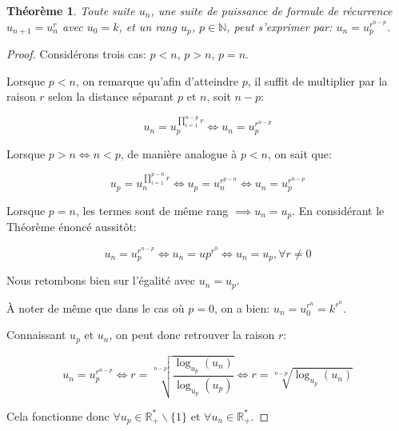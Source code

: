 \documentclass{amsart}
\newtheorem{theorem}{Théorème}[section]
\theoremstyle{definition}
\theoremstyle{remark}
\numberwithin{equation}{section}
\begin{document}
\begin{theorem}
    Toute suite $u_n$, une suite de puissance de formule de récurrence $u_{n+1}=u_n^r$ avec $u_0=k$, et un rang $u_p$, $p \in \mathbb{N}$, peut s'exprimer par: $u_n = u_p^{r^{n-p}}$.
\end{theorem}

\begin{proof}
    Considérons trois cas: $p<n$, $p>n$, $p=n$.

    Lorsque $p<n$, on remarque qu'afin d'atteindre $p$, il suffit de multiplier par la raison $r$ selon la distance séparant $p$ et $n$, soit $n-p$:
    
    \[u_n = u_p^{\prod_{i=1}^{n-p}r} \iff u_n = u_p^{r^{n-p}}\]
    
    Lorsque $p>n \iff n<p$, de manière analogue à $p<n$, on sait que:

    \[u_p = u_n^{\prod_{i=1}^{p-n}r} \iff u_p = u_n^{r^{p-n}} \iff u_n = u_p^{r^{n-p}}\]


    Lorsque $p=n$, les termes sont de même rang $\implies u_n=u_p$. En considérant le Théorème énoncé aussitôt:

    \[u_n = u_p^{r^{n-p}} \iff u_n=up^{r^0} \iff u_n=u_p, \forall r \ne 0\]

    Nous retombons bien sur l'égalité avec $u_n=u_p$.
    
    À noter de même que dans le cas où $p=0$, on a bien: $u_n=u_0^{r^n}=k^{r^n}$.

    Connaissant $u_p$ et $u_n$, on peut donc retrouver la raison $r$:

    \[u_n = u_p^{r^{n-p}} \iff r=\sqrt[n-p]{\frac{\log_{u_p}(u_n)}{\log_{u_p}(u_p)}} \iff r=\sqrt[n-p]{\log_{u_p}(u_n)}\]

    Cela fonctionne donc $\forall u_p \in \mathbb{R_{+}^*}\backslash\lbrace{1}\rbrace$ et $\forall u_n \in \mathbb{R_{+}^*}$.


\end{proof}
\end{document}
